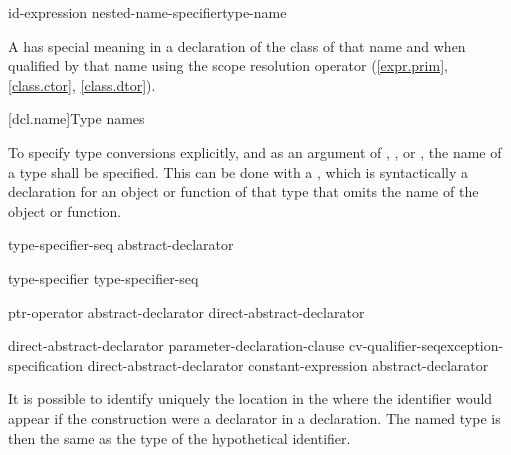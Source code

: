 \begin{bnf}
\br
    \br
\end{bnf}

\begin{bnf}
\br
    id-expression\br
    \terminal{::}\opt nested-name-specifier\opt type-name
\end{bnf}

%
A
has special meaning in a declaration of the class of that name
and when qualified by that name using the scope resolution operator
\tcode{::}
(\ref{expr.prim}, \ref{class.ctor}, \ref{class.dtor}).

[dcl.name]{Type names}

\pnum
{}%
To specify type conversions explicitly,
%
and as an argument of
,
,
or
,
the name of a type shall be specified.
This can be done with a
,
which is syntactically a declaration for an object or function
of that type that omits the name of the object or function.

\begin{bnf}
\br
    type-specifier-seq abstract-declarator\opt
\end{bnf}

\begin{bnf}
\br
    type-specifier type-specifier-seq\opt
\end{bnf}

\begin{bnf}
\br
    ptr-operator abstract-declarator\opt\br
    direct-abstract-declarator
\end{bnf}

\begin{bnftab}
\br
    \>direct-abstract-declarator\opt\br
	\>\>\terminal{(} parameter-declaration-clause \terminal{)}
	cv-qualifier-seq\opt exception-specification\opt\br
    \>direct-abstract-declarator\opt \terminal{[} constant-expression\opt{} \terminal{]}\br
    \>\terminal{(} abstract-declarator \terminal{)}
\end{bnftab}

It is possible to identify uniquely the location in the
where the identifier would appear if the construction were a declarator
in a declaration.
The named type is then the same as the type of the
hypothetical identifier.
\enterexample


